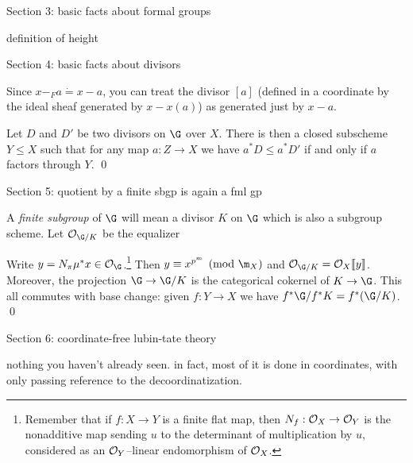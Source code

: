 Section 3: basic facts about formal groups

definition of height

Section 4: basic facts about divisors

Since $x -_F a \dot= x - a$, you can treat the divisor $[a]$ (defined in a coordinate by the ideal sheaf generated by $x - x(a)$) as generated just by $x - a$.

\begin{lemma}
Let $D$ and $D'$ be two divisors on $\G$ over $X$.  There is then a closed subscheme $Y \le X$ such that for any map $a: Z \to X$ we have $a^* D \le a^* D'$ if and only if $a$ factors through $Y$. \qed
\end{lemma}

Section 5: quotient by a finite sbgp is again a fml gp

\begin{definition}
A \textit{finite subgroup} of $\G$ will mean a divisor $K$ on $\G$ which is also a subgroup scheme.  Let $\sheaf{O}_{\G/K}$ be the equalizer
\begin{center}
\end{center}
\end{definition}

\begin{lemma}
Write $y = N_\pi \mu^* x \in \sheaf O_{\G}$.\footnote{Remember that if $f: X \to Y$ is a finite flat map, then $N_f: \mathcal{O}_X \to \mathcal{O}_Y$ is the nonadditive map sending $u$ to the determinant of multiplication by $u$, considered as an $\mathcal{O}_Y$--linear endomorphism of $\mathcal{O}_X$.}  Then $y \equiv x^{p^m} \pmod{\m_X}$ and $\sheaf O_{\G/K} = \sheaf O_X\ps{y}$.  Moreover, the projection $\G \to \G/K$ is the categorical cokernel of $K \to \G$.  This all commutes with base change: given $f: Y \to X$ we have $f^* \G / f^* K = f^*(\G/K)$. \qed {}
\end{lemma}


Section 6: coordinate-free lubin-tate theory

nothing you haven't already seen. in fact, most of it is done in coordinates, with only passing reference to the decoordinatization.


